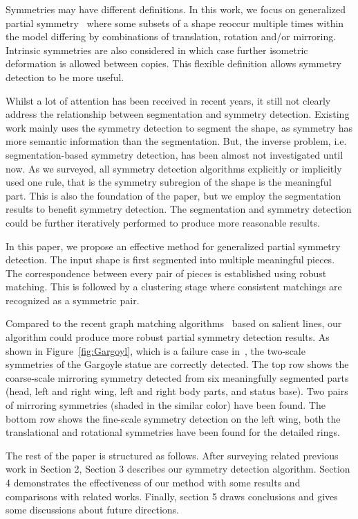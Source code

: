 Symmetries may have different definitions. In this work, we focus on generalized partial symmetry~\cite{mitra2006,berner2011} where some subsets of a shape reoccur multiple times within the model differing by combinations of translation, rotation and/or mirroring. Intrinsic symmetries are also considered in which case further isometric deformation is allowed between copies. This flexible definition allows symmetry detection to be more useful.

Whilst a lot of attention has been received in recent years, it still not clearly address the relationship between segmentation and symmetry detection.
Existing work mainly uses the symmetry detection to segment the shape, as symmetry has more semantic information than the segmentation.
But, the inverse problem, i.e. segmentation-based symmetry detection, has been almost not investigated until now.  
As we surveyed, all symmetry detection algorithms explicitly or implicitly used one rule, that is the symmetry subregion of the shape is the meaningful part.
This is also the foundation of the paper, but we employ the segmentation results to benefit symmetry detection.
The segmentation and symmetry detection could be further iteratively performed to produce more reasonable results.

In this paper, we propose an effective method for generalized partial symmetry detection.
The input shape is first segmented into multiple meaningful pieces. The correspondence between every pair of pieces
is established using robust matching.
This is followed by a clustering stage where consistent matchings are recognized as a symmetric pair.

Compared to the recent graph matching algorithms~\cite{bokeloh2009,berner2011} based on salient lines, our algorithm could produce more robust partial symmetry detection results.
As shown in Figure~\ref{fig:Gargoyl}, which is a failure case in~\cite{berner2011}, the two-scale symmetries of the Gargoyle statue are correctly detected.
The top row shows the coarse-scale mirroring symmetry detected from six meaningfully segmented parts (head, left and right wing, left and right body parts, and status base).
Two pairs of mirroring symmetries (shaded in the similar color) have been found.
The bottom row shows the fine-scale symmetry detection on the left wing, both the translational and rotational symmetries have been found for the detailed rings.

The rest of the paper is structured as follows. After surveying related previous work in Section 2, Section 3 describes our symmetry detection algorithm.
Section 4 demonstrates the effectiveness of our method with some results and comparisons with related works. Finally, section 5 draws conclusions and gives some discussions about future directions. 